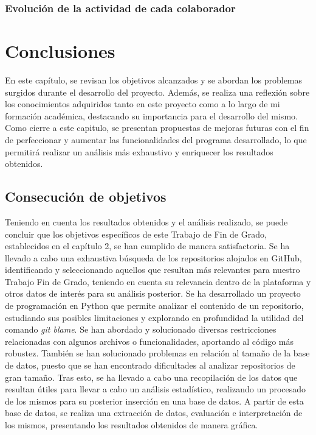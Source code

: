 \documentclass[a4paper, 12pt]{book}
\begin{document}
\subsection{Evolución de la actividad de cada colaborador}
\label{subsec:actividad-colaborador}


\cleardoublepage
\chapter{Conclusiones}
\label{chap:conclusiones}

En este capítulo, se revisan los objetivos alcanzados y se abordan los problemas surgidos durante el desarrollo del proyecto. Además, se realiza una
reflexión sobre los conocimientos adquiridos tanto en este proyecto como a lo largo de mi formación académica, destacando su importancia para el
desarrollo del mismo. Como cierre a este capitulo, se presentan propuestas de mejoras futuras con el fin de perfeccionar y aumentar las funcionalidades
del programa desarrollado, lo que permitirá realizar un análisis más exhaustivo y enriquecer los resultados obtenidos.

\section{Consecución de objetivos}
\label{sec:consecucion-objetivos}

Teniendo en cuenta los resultados obtenidos y el análisis realizado, se puede concluir que los objetivos específicos de este Trabajo de Fin de Grado, establecidos
en el capítulo 2, se han cumplido de manera satisfactoria. Se ha llevado a cabo una exhaustiva búsqueda de los repositorios alojados en GitHub, identificando
y seleccionando aquellos que resultan más relevantes para nuestro Trabajo Fin de Grado, teniendo en cuenta su relevancia dentro de la plataforma y otros datos de interés para
su análisis posterior. Se ha desarrollado un proyecto de programación en Python que permite analizar el contenido de un repositorio, estudiando sus posibles limitaciones
y explorando en profundidad la utilidad del comando \textit{git blame}. Se han abordado y solucionado diversas restricciones relacionadas con algunos archivos o funcionalidades,
aportando al código más robustez. También se han solucionado problemas en relación al tamaño de la base de datos, puesto que se han encontrado dificultades al analizar 
repositorios de gran tamaño. Tras esto, se ha llevado a cabo una recopilación de los datos que resultan útiles para llevar a cabo un análisis estadístico, realizando un
procesado de los mismos para su posterior inserción en una base de datos. A partir de esta base de datos, se realiza una extracción de datos, evaluación e interpretación
de los mismos, presentando los resultados obtenidos de manera gráfica.
\end{document}
